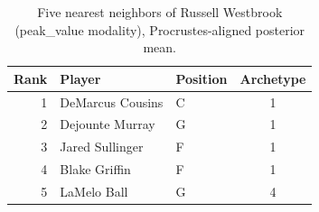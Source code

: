 \begin{table}[htbp]
  \centering\small
  \begin{tabular}{rllc}
    \toprule
    Rank & Player & Position & Archetype \\
    \midrule
    1 & DeMarcus Cousins & C & 1 \\
    2 & Dejounte Murray & G & 1 \\
    3 & Jared Sullinger & F & 1 \\
    4 & Blake Griffin & F & 1 \\
    5 & LaMelo Ball & G & 4 \\
    \bottomrule
  \end{tabular}
  \caption{Five nearest neighbors of Russell Westbrook (peak_value modality), Procrustes-aligned posterior mean.}
  \label{tab:Russell_Westbrook_neighbors_peak_value}
\end{table}

